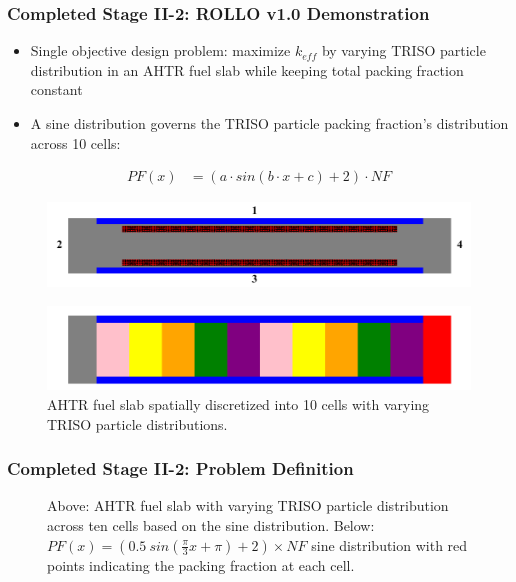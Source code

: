 \begin{frame}
    \frametitle{Completed Stage II-2: ROLLO v1.0 Demonstration}
    \begin{itemize}
        \item Single objective design problem: maximize $k_{eff}$ by varying 
        TRISO particle distribution in an AHTR fuel slab while keeping total 
        packing fraction constant
        \item A sine distribution governs the TRISO particle packing fraction's 
        distribution across 10 cells:
    \end{itemize}
    \begin{align*}
        PF(x) &= \left(a\cdot sin(b\cdot x + c) + 2\right) \cdot NF
    \end{align*}
    \begin{figure}[]
        \centering
        \includegraphics[width=0.6\linewidth]{../docs/figures/straightened_slab.png} 
    \end{figure}
    \begin{figure}[]
        \includegraphics[width=0.6\linewidth]{../docs/figures/straightened_slab_mg.png}
        \caption{AHTR fuel slab spatially discretized into 10 cells with varying 
        TRISO particle distributions.}
    \end{figure}
\end{frame}

\begin{frame}
    \frametitle{Completed Stage II-2: Problem Definition}
    \begin{figure}[]
        \centering
        \caption{Above: AHTR fuel slab with varying TRISO particle 
        distribution across ten cells based on the sine distribution. 
        Below: $PF(x) = (0.5\ sin(\frac{\pi}{3}x + \pi) + 2)  \times NF$ 
        sine distribution with red points indicating the packing fraction at each cell.}
    \end{figure}
\end{frame}

